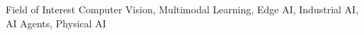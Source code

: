 \begin{rSection}{Field of Interest}
  Computer Vision, Multimodal Learning, Edge AI, Industrial AI, AI Agents, Physical AI
\end{rSection}
